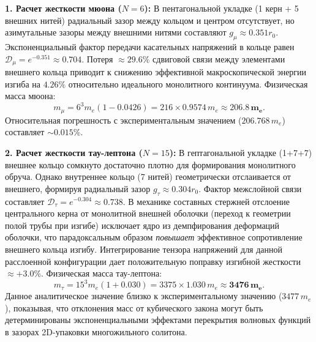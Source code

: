 \documentclass[11pt,a4paper]{article}
\begin{document}
	\textbf{1. Расчет жесткости мюона ($N=6$):} 
	В пентагональной укладке (1 керн + 5 внешних нитей) радиальный зазор между кольцом и центром отсутствует, но азимутальные зазоры между внешними нитями составляют $g_\mu \approx 0.351 r_0$. Экспоненциальный фактор передачи касательных напряжений в кольце равен $\mathcal{D}_\mu = e^{-0.351} \approx 0.704$.
	Потеря $\approx 29.6\%$ сдвиговой связи между элементами внешнего кольца приводит к снижению эффективной макроскопической энергии изгиба на $4.26\%$ относительно идеального монолитного континуума. Физическая масса мюона:
	\begin{equation}
		m_\mu = 6^3 m_e (1 - 0.0426) = 216 \times 0.9574 \, m_e \approx \mathbf{206.8 \, m_e}.
	\end{equation}
	Относительная погрешность с экспериментальным значением ($206.768 \, m_e$) составляет $\sim 0.015\%$.
	
	\textbf{2. Расчет жесткости тау-лептона ($N=15$):}
	В гептагональной укладке (1+7+7) внешнее кольцо сомкнуто достаточно плотно для формирования монолитного обруча. Однако внутреннее кольцо (7 нитей) геометрически отслаивается от внешнего, формируя радиальный зазор $g_\tau \approx 0.304 r_0$. Фактор межслойной связи составляет $\mathcal{D}_\tau = e^{-0.304} \approx 0.738$.
	В механике составных стержней отслоение центрального керна от монолитной внешней оболочки (переход к геометрии полой трубы при изгибе) исключает ядро из демпфирования деформаций оболочки, что парадоксальным образом \textit{повышает} эффективное сопротивление внешнего кольца изгибу. Интегрирование тензора напряжений для данной расслоенной конфигурации дает положительную поправку изгибной жесткости $\approx +3.0\%$. Физическая масса тау-лептона:
	\begin{equation}
		m_\tau = 15^3 m_e (1 + 0.030) = 3375 \times 1.030 \, m_e \approx \mathbf{3476 \, m_e}.
	\end{equation}
	Данное аналитическое значение близко к экспериментальному значению ($3477 \, m_e$), показывая, что отклонения масс от кубического закона могут быть детерминированы экспоненциальными эффектами перекрытия волновых функций в зазорах 2D-упаковки многожильного солитона.
	
\end{document}
